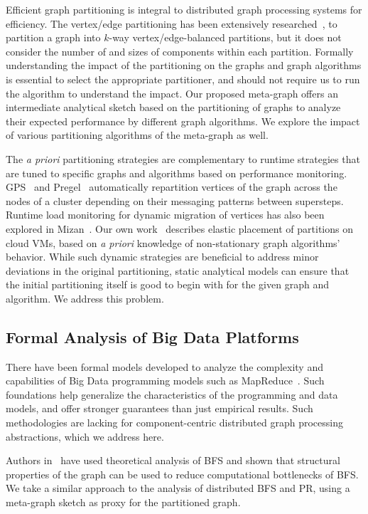 \documentclass[10pt,conference, compsocconf]{IEEEtran}
\begin{document}
Efficient graph partitioning is integral to distributed graph processing systems for efficiency. 
The vertex/edge partitioning has been extensively researched~\cite{metis,scotch,bourse2014balanced}, to partition a graph into $k$-way vertex/edge-balanced partitions, but it does not consider the number of and sizes of components within each partition. Formally understanding the impact of the partitioning on the graphs and graph algorithms is essential to select the appropriate partitioner, and should not require us to run the algorithm to understand the impact. Our proposed meta-graph offers an intermediate analytical sketch based on the partitioning of graphs to analyze their expected performance by different graph algorithms. We explore the impact of various partitioning algorithms of the meta-graph as well.
  
The \emph{a priori} partitioning strategies are complementary to runtime strategies that are tuned to specific graphs and algorithms based on performance monitoring. GPS~\cite{gps} and Pregel~\cite{pregel} automatically repartition vertices of the graph across the nodes of a cluster depending on their messaging patterns between supersteps. Runtime load monitoring for dynamic migration of vertices has also been explored in Mizan~\cite{mizan}. Our own work~\cite{ccgrid} describes elastic placement of partitions on cloud VMs, based on \emph{a priori} knowledge of non-stationary graph algorithms' behavior. While such dynamic strategies are beneficial to address minor deviations in the original partitioning, static analytical models can ensure that the initial partitioning itself is good to begin with for the given graph and algorithm. We address this problem.

\subsection{Formal Analysis of Big Data Platforms} 
There have been formal models developed to analyze the complexity and capabilities of Big Data programming models such as MapReduce~\cite{karloff2010model,sarma2013upper}. Such foundations help generalize the characteristics of the programming and data models, and offer stronger guarantees than just empirical results. Such methodologies are lacking for component-centric distributed graph processing abstractions, which we address here.

Authors in~\cite{fay2016predictive} have used theoretical analysis of BFS and shown that structural properties of the graph can be used to reduce computational bottlenecks of BFS. We take a similar approach to the analysis of distributed BFS and PR, using a meta-graph sketch as proxy for the partitioned graph.
\end{document}
